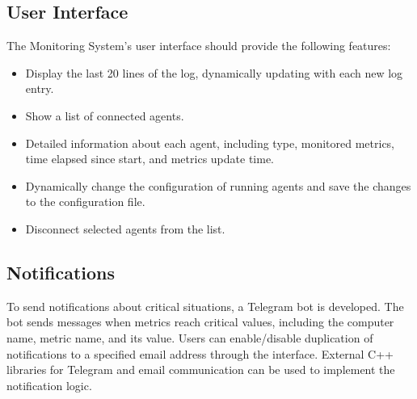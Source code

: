\documentclass[12pt, letterpaper]{article}
\begin{document}
\subsection{User Interface}
The Monitoring System's user interface should provide the following features:
\begin{itemize}
    \item Display the last 20 lines of the log, dynamically updating with each new log entry.
    \item Show a list of connected agents.
    \item Detailed information about each agent, including type, monitored metrics, time elapsed since start, and metrics update time.
    \item Dynamically change the configuration of running agents and save the changes to the configuration file.
    \item Disconnect selected agents from the list.
\end{itemize}

\subsection{Notifications}
To send notifications about critical situations, a Telegram bot is developed. The bot sends messages when metrics reach critical values, including the computer name, metric name, and its value. Users can enable/disable duplication of notifications to a specified email address through the interface. External C++ libraries for Telegram and email communication can be used to implement the notification logic.
\end{document}
